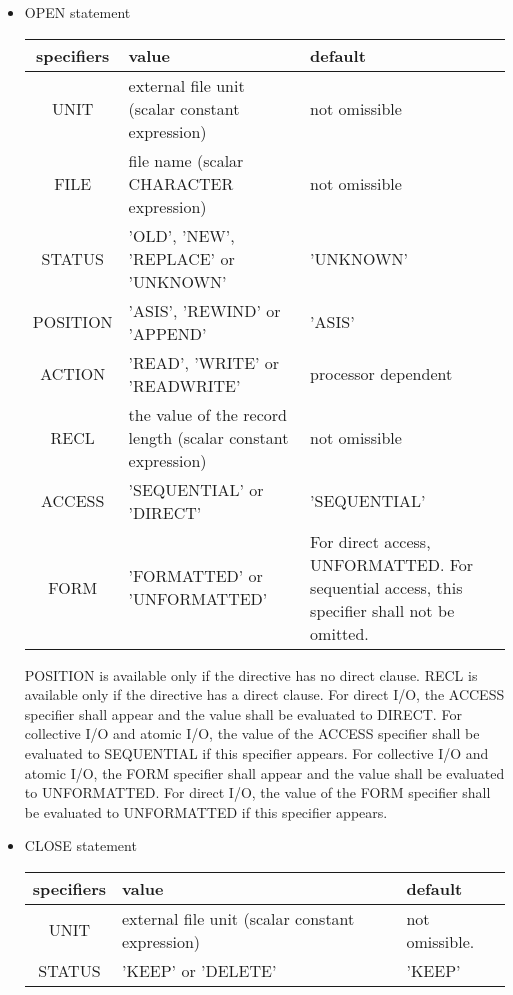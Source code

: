    \begin{itemize}
   \item OPEN statement
   
   \begin{table}[h]
    \begin{center}
     \label{tb:globalopen}
     \begin{tabular}{|c||p{55mm}|p{70mm}|}
       \hline
       specifiers & value & default \\ \hline \hline
      UNIT & external file unit (scalar constant expression) & not omissible \\ \hline
      FILE & file name (scalar CHARACTER expression) & not omissible \\ \hline
      STATUS & 'OLD', 'NEW', 'REPLACE' or 'UNKNOWN' & 'UNKNOWN' \\ \hline
      POSITION & 'ASIS', 'REWIND' or 'APPEND' & 'ASIS' \\ \hline
      ACTION & 'READ', 'WRITE' or 'READWRITE' & processor dependent \\ \hline
      RECL & the value of the record length (scalar constant expression) & not omissible \\ \hline
      ACCESS & 'SEQUENTIAL' or 'DIRECT' & 'SEQUENTIAL' \\ \hline
      FORM & 'FORMATTED' or 'UNFORMATTED' & For direct access, UNFORMATTED. For sequential access, this specifier shall not be omitted. \\ \hline
     \end{tabular}
    \end{center}
   \end{table}

   POSITION is available only if the directive has no direct clause.
   RECL is available only if the directive has a direct clause.
   For direct I/O, the ACCESS specifier shall appear and the value shall be evaluated to DIRECT.
   For collective I/O and atomic I/O, the value of the ACCESS specifier shall be evaluated to SEQUENTIAL if this specifier appears.
   For collective I/O and atomic I/O, the FORM specifier shall appear and the value shall be evaluated to UNFORMATTED.
   For direct I/O, the value of the FORM specifier shall be evaluated to UNFORMATTED if this specifier appears.

   \item CLOSE statement
	  
   \begin{table}[h]
    \begin{center}
     \label{tb:globalopen}
     \begin{tabular}{|c||p{90mm}|l|}
        \hline
      specifiers & value & default \\ \hline \hline
      UNIT & external file unit (scalar constant expression)
      & not omissible. \\ \hline
      STATUS & 'KEEP' or 'DELETE'
	  & 'KEEP' \\ \hline
     \end{tabular}
    \end{center}
   \end{table}


\end{itemize}
